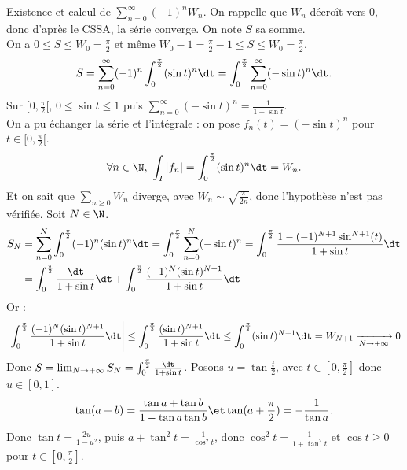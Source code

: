 \documentclass[11pt]{article}
\begin{document}
\begin{ex}{}{}
    Existence et calcul de $\sum_{n=0}^{\infty}(-1)^n W_n$.
    \tcblower
    On rappelle que $W_n$ décroît vers 0, donc d'après le CSSA, la série converge. On note $S$ sa somme.\\
    On a $0\leq S \leq W_0 = \frac{\pi}{2}$ et même $W_0-1 = \frac{\pi}{2}-1\leq S \leq W_0 = \frac{\pi}{2}$.
    \begin{equation*}
        S=\sum_{n=0}^{\infty}(-1)^n\int_0^{\frac{\pi}{2}}(\sin t)^n\dt=\int_0^{\frac{\pi}{2}}\sum_{n=0}^{\infty}(-\sin t)^n\dt.
    \end{equation*}
    Sur $[0,\frac{\pi}{2}[$, $0\leq\sin t\leq 1$ puis $\sum_{n=0}^{\infty}(-\sin t)^n = \frac{1}{1+\sin t}$.\\
    On a pu échanger la série et l'intégrale : on pose $f_n(t)=(-\sin t)^n$ pour $t\in[0,\frac{\pi}{2}[$.
    \begin{equation*}
        \forall n \in \N, ~ \int_I|f_n| = \int_0^{\frac{\pi}{2}}(\sin t)^n\dt = W_n.
    \end{equation*}
    Et on sait que $\sum_{n\geq0} W_n$ diverge, avec $W_n\sim\sqrt{\frac{\pi}{2n}}$, donc l'hypothèse n'est pas vérifiée. Soit $N\in\N$.
    \begin{align*}S_N&=\sum_{n=0}^N\int_0^\frac{\pi}{2}(-1)^n(\sin t)^n\dt = \int_0^{\frac{\pi}{2}}\sum_{n=0}^N(-\sin t)^n=\int_0^\frac{\pi}{2}\frac{1-(-1)^{N+1}\sin^{N+1}(t)}{1+\sin t}\dt\\&=\int_0^{\frac{\pi}{2}}\frac{\dt}{1+\sin t}\dt + \int_0^{\frac{\pi}{2}}\frac{(-1)^N(\sin t)^{N+1}}{1+\sin t}\dt\end{align*}
    Or :
    \begin{equation*}
        \left|\int_0^\frac{\pi}{2}\frac{(-1)^N(\sin t)^{N+1}}{1+\sin t}\dt\right| \leq \int_0^\frac{\pi}{2}\frac{(\sin t)^{N+1}}{1+\sin t}\dt  \leq \int_0^{\frac{\pi}{2}}(\sin t)^{N+1}\dt = W_{N+1}\xrightarrow[N\to+\infty]{}0
    \end{equation*}
    Donc $S=\lim_{N\to+\infty}S_N=\int_0^{\frac{\pi}{2}}\frac{\dt}{1+\sin t}$. Posons $u=\tan\frac{t}{2}$, avec $t\in[0,\frac{\pi}{2}]$ donc $u\in[0,1]$.
    \begin{equation*}
        \tan(a+b)=\frac{\tan a + \tan b}{1 - \tan a \tan b} \et \tan(a+\frac{\pi}{2})=-\frac{1}{\tan a}.
    \end{equation*}
    Donc $\tan t = \frac{2u}{1-u^2}$, puis $a+\tan^2t=\frac{1}{\cos^2t}$, donc $\cos^2t=\frac{1}{1+\tan^2t}$ et $\cos t \geq 0$ pour $t\in[0,\frac{\pi}{2}]$.\\

\end{ex}
\end{document}
